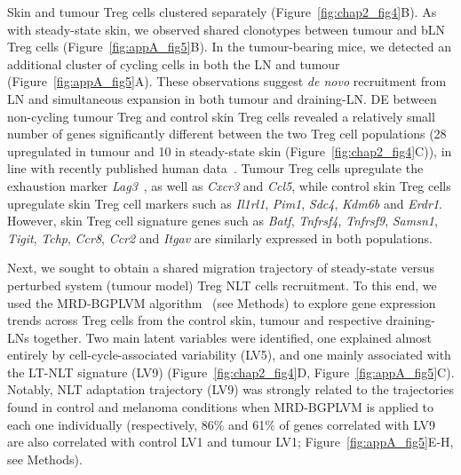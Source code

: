Skin and tumour Treg cells clustered separately (Figure~\ref{fig:chap2_fig4}B). As with steady-state skin, we observed shared clonotypes between tumour and bLN Treg cells (Figure~\ref{fig:appA_fig5}B). In the tumour-bearing mice, we detected an additional cluster of cycling cells in both the LN and tumour (Figure~\ref{fig:appA_fig5}A). These observations suggest \textit{de novo} recruitment from LN and simultaneous expansion in both tumour and draining-LN. DE between non-cycling tumour Treg and control skin Treg cells revealed a relatively small number of genes significantly different between the two Treg cell populations (28 upregulated in tumour and 10 in steady-state skin (Figure~\ref{fig:chap2_fig4}C)), in line with recently published human data~\citep{Plitas2016-rg}. Tumour Treg cells upregulate the exhaustion marker \textit{Lag3}~\citep{Malik2017-pw}, as well as \textit{Cxcr3} and \textit{Ccl5}, while control skin Treg cells upregulate skin Treg cell markers such as \textit{Il1rl1}, \textit{Pim1}, \textit{Sdc4}, \textit{Kdm6b} and \textit{Erdr1}. However, skin Treg cell signature genes such as \textit{Batf}, \textit{Tnfrsf4}, \textit{Tnfrsf9}, \textit{Samsn1}, \textit{Tigit}, \textit{Tchp}, \textit{Ccr8}, \textit{Ccr2} and \textit{Itgav} are similarly expressed in both populations.

Next, we sought to obtain a shared migration trajectory of steady-state versus perturbed system (tumour model) Treg NLT cells recruitment. To this end, we used the MRD-BGPLVM algorithm~\citep{Andreas_Damianou_Carl_Ek_Michalis_Titsias_Neil_Lawrence2012-do} (see Methods) to explore gene expression trends across Treg cells from the control skin, tumour and respective draining-LNs together. Two main latent variables were identified, one explained almost entirely by cell-cycle-associated variability (LV5), and one mainly associated with the LT-NLT signature (LV9) (Figure~\ref{fig:chap2_fig4}D, Figure~\ref{fig:appA_fig5}C). Notably, NLT adaptation trajectory (LV9) was strongly related to the trajectories found in control and melanoma conditions when MRD-BGPLVM is applied to each one individually (respectively, 86${\%}$ and 61${\%}$ of genes correlated with LV9 are also correlated with control LV1 and tumour LV1; Figure~\ref{fig:appA_fig5}E-H, see Methods).

